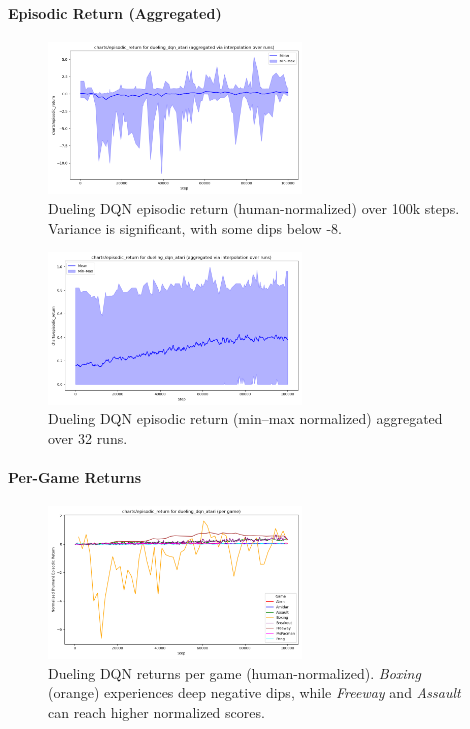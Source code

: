 \paragraph{Episodic Return (Aggregated)}

\begin{figure}
	\centering
	\includegraphics[width=0.6\textwidth]{figures/dueling_dqn/charts_episodic_return_human_dueling_dqn_atari.png}
	\caption{Dueling DQN episodic return (human-normalized) over 100k steps. 
		Variance is significant, with some dips below -8.}
	\label{fig:dueling_return_human}
\end{figure}

\begin{figure}
	\centering
	\includegraphics[width=0.6\textwidth]{figures/dueling_dqn/charts_episodic_return_minmax_dueling_dqn_atari.png}
	\caption{Dueling DQN episodic return (min--max normalized) aggregated over 32 runs.}
	\label{fig:dueling_return_minmax}
\end{figure}

\paragraph{Per-Game Returns}

\begin{figure}
	\centering
	\includegraphics[width=0.6\textwidth]{figures/dueling_dqn/charts_episodic_return_per_game_human_dueling_dqn_atari.png}
	\caption{Dueling DQN returns per game (human-normalized). 
		\emph{Boxing} (orange) experiences deep negative dips, while \emph{Freeway} and \emph{Assault} can reach higher normalized scores.}
	\label{fig:dueling_return_pergame_human}
\end{figure}

